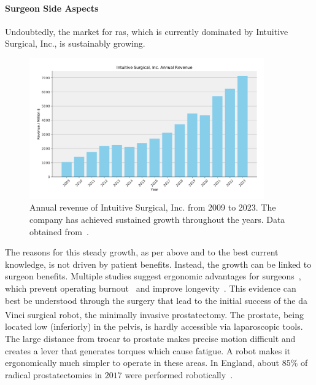 \paragraph{Surgeon Side Aspects} Undoubtedly, the market for \gls{ras}, which is currently dominated by Intuitive Surgical, Inc., is sustainably growing. 

\begin{figure}[tb]
    \centering
    \includegraphics[width=0.9\textwidth]{introduction/fig/intuitive_revenue.pdf}
    \caption{Annual revenue of Intuitive Surgical, Inc. from 2009 to 2023. The company has achieved sustained growth throughout the years. Data obtained from~\cite{intuitiverevenue}.}
    \label{in:fig:intuitive_revenue}
\end{figure}

The reasons for this steady growth, as per above and to the best current knowledge, is not driven by patient benefits. Instead, the growth can be linked to surgeon benefits. Multiple studies suggest ergonomic advantages for surgeons~\cite{monfared2022comparison, zarate2019ergonomic}, which prevent operating burnout~\cite{wells2019operating} and improve longevity~\cite{stucky2018surgeon}. This evidence can best be understood through the surgery that lead to the initial success of the da Vinci\textsuperscript{\textregistered} surgical robot, the minimally invasive prostatectomy. The prostate, being located low (inferiorly) in the pelvis, is hardly accessible via laparoscopic tools. The large distance from trocar to prostate makes precise motion difficult and creates a lever that generates torques which cause fatigue. A robot makes it ergonomically much simpler to operate in these areas. In England, about $85\%$ of radical prostatectomies in $2017$ were performed robotically~\cite{maynou2021patterns}.

